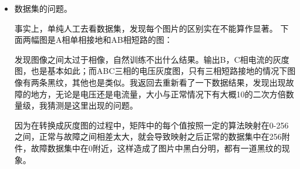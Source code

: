 \documentclass{article}
\begin{document}
	\begin{itemize}
		\item 数据集的问题。
		
		事实上，单纯人工去看数据集，发现每个图片的区别实在不能算作显著。
		下面两幅图是A相单相接地和AB相短路的图：
		
		\begin{figure}[h]
			\centering
		\end{figure}
	
		发现图像之间太过于相像，自然训练不出什么结果。输出B，C相电流的灰度图，也是基本如此；而ABC三相的电压灰度图，只有三相短路接地的情况下图像有两条黑纹，其他也是类似。我返回去重新看了一下数据结果，发现出现故障的地方，无论是电压还是电流量，大小与正常情况下有大概10的二次方倍数量级，我猜测是这里出现的问题。
		
		因为在转换成灰度图的过程中，矩阵中的每个值按照一定的算法映射在0-256之间，正常与故障之间相差太大，就会导致映射之后正常的数据集中在256附件，故障数据集中在0附近，这样造成了图片中黑白分明，都有一道黑纹的现象。
		

\end{itemize}
\end{document}
